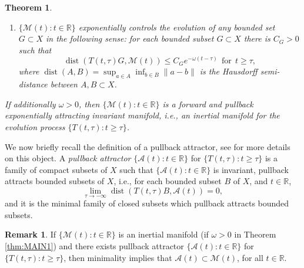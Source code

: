 \documentclass[a4paper,11pt,reqno]{amsart}
\theoremstyle{plain}
\newtheorem{thm}[lem]{Theorem}
\theoremstyle{definition}
\newtheorem{rem}[lem]{Remark}
\numberwithin{equation}{section}
\newcommand{\R}{\mathbb{R}}
\newcommand{\cala}{\mathcal A}
\newcommand{\calm}{\mathcal M}
\newcommand{\norm}[1]{\left\Vert#1\right\Vert}
\newcommand{\dist}{\operatorname{dist}}
\renewcommand{\geq}{\geqslant}
\renewcommand{\leq}{\leqslant}
\begin{document}
\begin{thm}
\begin{enumerate}
\begin{equation*}
\omega=\gamma-\frac{(\gamma-\rho)L_2\Gamma(0,1)}{\gamma-\rho-L_1\Gamma(1,\kappa_\Sigma)}\in(\rho,\gamma),
\end{equation*}
      \item[(IV)] $\{\mathcal{M}(t)\colon t\in \R\}$  exponentially controls the evolution of any bounded set $G\subset X$ in the following sense: for each bounded subset $G\subset X$ there is $C_G>0$ such that 
\begin{equation*}
\dist(T(t,\tau)G,\mathcal{M}(t))\leq C_Ge^{-\omega(t-\tau)}\ \ \text{for}\  \ t\geq \tau,
\end{equation*}
where $\dist(A,B)=\sup_{a\in A}\inf_{b\in B}{\|a-b\|}$ is the Hausdorff semi-distance between $A,B\subset X$.
\end{enumerate}
If additionally $\omega>0$, then $\{\calm(t)\colon t\in\R\}$ is a forward and pullback exponentially attracting invariant manifold, i.e., an inertial manifold for the evolution process $\{T(t,\tau)\colon t\geq\tau\}$. 

	
\end{thm}

We now briefly recall the definition of a pullback attractor, see \cite{CLR} for {more details on} %
this object. 
    A \textit{pullback attractor} 
    {$\{\cala(t)\colon t\in\R\}$ for $\{T(t,\tau)\colon t\geq\tau\}$} is a family of compact subsets of $X$ such that $\{\cala(t)\colon t\in\R\}$ is invariant, pullback attracts bounded subsets of $X$, i.e., for each bounded subset $B$ of $X$, and $t
\in \R$, 
\begin{equation*}
    \lim_{
    \tau\to -\infty}\dist(T(t,\tau)B,\mathcal{A}(t))=0,
\end{equation*}
    and it is the minimal family of closed subsets which pullback attracts bounded subsets.
\begin{rem} 
    If $\{\calm(t)\colon t\in\R\}$ is an inertial manifold (if $\omega>0$ in Theorem \ref{thm:MAIN1}) and there exists pullback attractor $\{\cala(t)\colon t\in\R\}$ for $\{T(t,\tau)\colon t\geq\tau\}$, then minimality implies that $\cala(t)\subset \calm(t)$, for all $t\in\R$.
\end{rem}


    

\end{document}
